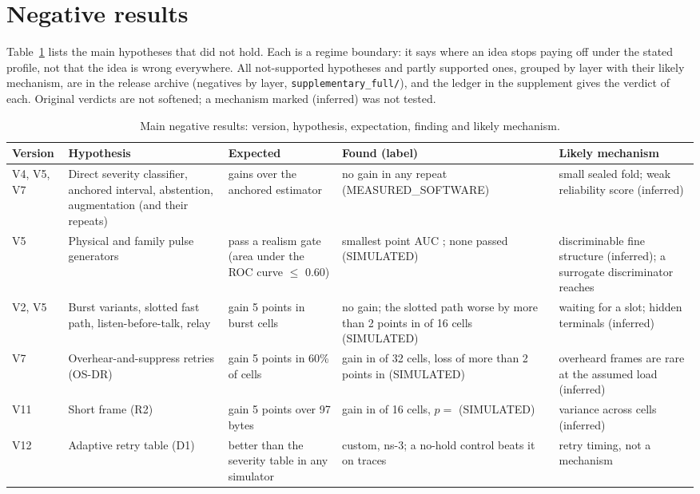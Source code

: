\documentclass{ieeeaccess}
\begin{document}
\section{Negative results}
\label{sec:neg}
Table~\ref{tab:neg} lists the main hypotheses that did not hold. Each is a regime boundary: it says where an idea stops paying off under the stated profile, not that the idea is wrong everywhere. All \LedgerNot{} not-supported hypotheses and \LedgerPartly{} partly supported ones, grouped by layer with their likely mechanism, are in the release archive (negatives by layer, \texttt{supplementary\_full/}), and the ledger in the supplement gives the verdict of each. Original verdicts are not softened; a mechanism marked (inferred) was not tested.
\begin{table}[t]\centering\caption{Main negative results: version, hypothesis, expectation, finding and likely mechanism.}\label{tab:neg}\small
\begin{tabular}{p{1.0cm}p{3.1cm}p{3.1cm}p{4.9cm}p{4.2cm}}\toprule
Version & Hypothesis & Expected & Found (label) & Likely mechanism\\\midrule
V4, V5, V7 & Direct severity classifier, anchored interval, abstention, augmentation (and their repeats) & gains over the anchored estimator & no gain in any repeat (MEASURED\_SOFTWARE) & small sealed fold; weak reliability score (inferred)\\
V5 & Physical and family pulse generators & pass a realism gate (area under the ROC curve $\le$ 0.60) & smallest point AUC \NegGateAuc{}; none passed (SIMULATED) & discriminable fine structure (inferred); a surrogate discriminator reaches \NegSurrAuc{}\\
V2, V5 & Burst variants, slotted fast path, listen-before-talk, relay & gain 5 points in burst cells & no gain; the slotted path worse by more than 2 points in \NegSlotLose{} of 16 cells (SIMULATED) & waiting for a slot; hidden terminals (inferred)\\
V7 & Overhear-and-suppress retries (OS-DR) & gain 5 points in 60\% of cells & gain in \NegOsdrGain{} of 32 cells, loss of more than 2 points in \NegOsdrLose{} (SIMULATED) & overheard frames are rare at the assumed load (inferred)\\
V11 & Short frame (R2) & gain 5 points over 97 bytes & gain in \RTwoCells{} of 16 cells, $p=$ \RTwoP{} (SIMULATED) & variance across cells (inferred)\\
V12 & Adaptive retry table (D1) & better than the severity table in any simulator & \XCustomDOneGain{} custom, \XNsDOneGain{} ns-3; a no-hold control beats it on traces & retry timing, not a mechanism\\

\end{tabular}
\end{table}
\end{document}
